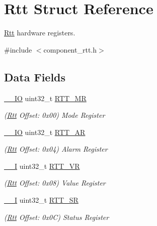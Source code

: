 \hypertarget{structRtt}{}\section{Rtt Struct Reference}
\label{structRtt}


\mbox{\hyperlink{structRtt}{Rtt}} hardware registers.  




{\ttfamily \#include $<$component\+\_\+rtt.\+h$>$}

\subsection*{Data Fields}
\begin{DoxyCompactItemize}
\item 
\mbox{\label{structRtt_a1aff9c8586d4d75b6266f60c3562a1fd}} 
\mbox{\hyperlink{core__cm7_8h_aec43007d9998a0a0e01faede4133d6be}{\+\_\+\+\_\+\+IO}} uint32\+\_\+t \mbox{\hyperlink{structRtt_a1aff9c8586d4d75b6266f60c3562a1fd}{R\+T\+T\+\_\+\+MR}}
\begin{DoxyCompactList}\small\item\em (\mbox{\hyperlink{structRtt}{Rtt}} Offset\+: 0x00) Mode Register \end{DoxyCompactList}\item 
\mbox{\label{structRtt_ac8d9b69c0a5c3525e54d02f4079f8212}} 
\mbox{\hyperlink{core__cm7_8h_aec43007d9998a0a0e01faede4133d6be}{\+\_\+\+\_\+\+IO}} uint32\+\_\+t \mbox{\hyperlink{structRtt_ac8d9b69c0a5c3525e54d02f4079f8212}{R\+T\+T\+\_\+\+AR}}
\begin{DoxyCompactList}\small\item\em (\mbox{\hyperlink{structRtt}{Rtt}} Offset\+: 0x04) Alarm Register \end{DoxyCompactList}\item 
\mbox{\label{structRtt_a7a723968e381b0865eb8e63aa9dabcaf}} 
\mbox{\hyperlink{core__cm7_8h_af63697ed9952cc71e1225efe205f6cd3}{\+\_\+\+\_\+I}} uint32\+\_\+t \mbox{\hyperlink{structRtt_a7a723968e381b0865eb8e63aa9dabcaf}{R\+T\+T\+\_\+\+VR}}
\begin{DoxyCompactList}\small\item\em (\mbox{\hyperlink{structRtt}{Rtt}} Offset\+: 0x08) Value Register \end{DoxyCompactList}\item 
\mbox{\label{structRtt_a357aa572cae79ea8256410fc3ef00a96}} 
\mbox{\hyperlink{core__cm7_8h_af63697ed9952cc71e1225efe205f6cd3}{\+\_\+\+\_\+I}} uint32\+\_\+t \mbox{\hyperlink{structRtt_a357aa572cae79ea8256410fc3ef00a96}{R\+T\+T\+\_\+\+SR}}
\begin{DoxyCompactList}\small\item\em (\mbox{\hyperlink{structRtt}{Rtt}} Offset\+: 0x0C) Status Register \end{DoxyCompactList}\end{DoxyCompactItemize}


